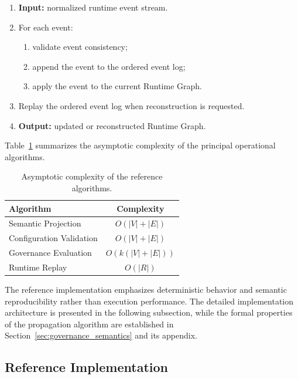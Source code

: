 \documentclass[10pt]{article}
\begin{document}
\begin{algorithm}[t]
	\caption{Runtime Integration}
	\begin{enumerate}
		\item \textbf{Input:} normalized runtime event stream.
		\item For each event:
		\begin{enumerate}
			\item validate event consistency;
			\item append the event to the ordered event log;
			\item apply the event to the current Runtime Graph.
		\end{enumerate}
		\item Replay the ordered event log when reconstruction is requested.
		\item \textbf{Output:} updated or reconstructed Runtime Graph.
	\end{enumerate}
\end{algorithm}

Table~\ref{tab:algorithm_complexity} summarizes the asymptotic complexity of the principal operational algorithms.

\begin{table}[t]
	\centering
	\caption{Asymptotic complexity of the reference algorithms.}
	\label{tab:algorithm_complexity}
	\small
	\begin{tabular}{lc}
		\toprule
		\textbf{Algorithm} & \textbf{Complexity} \\
		\midrule
		Semantic Projection & $O(|V|+|E|)$ \\
		Configuration Validation & $O(|V|+|E|)$ \\
		Governance Evaluation & $O(k(|V|+|E|))$ \\
		Runtime Replay & $O(|R|)$ \\
		\bottomrule
	\end{tabular}
\end{table}

The reference implementation emphasizes deterministic behavior and semantic reproducibility rather than execution performance. The detailed implementation architecture is presented in the following subsection, while the formal properties of the propagation algorithm are established in Section~\ref{sec:governance_semantics} and its appendix.

\subsection{Reference Implementation}
\label{sec:reference_implementation}
\end{document}

